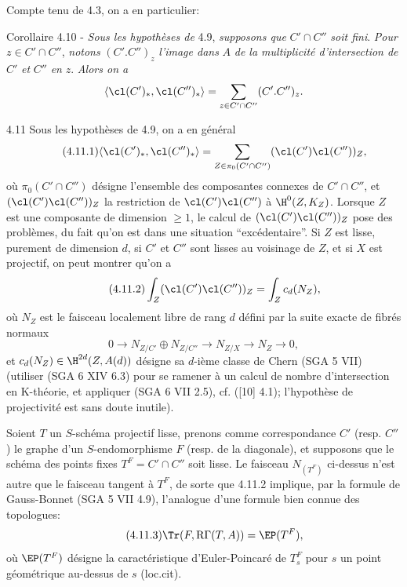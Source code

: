 Compte tenu de 4.3, on a en particulier:

\begin{statement}{Corollaire 4.10 -}
\emph{Sous les hypothèses de} 4.9, \emph{supposons que} $C'\cap C''$ \emph{soit fini}. \emph{Pour} $z\in C'\cap C''$, \emph{notons} $(C'.C'')_z$ \emph{l'image dans} $A$ \emph{de la multiplicité d'intersection de} $C'$ \emph{et} $C''$ \emph{en} $z$. \emph{Alors on a}
\[
\langle \cl(C')_*,\cl(C'')_*\rangle
=
\sum_{z\in C'\cap C''}(C'.C'')_z.
\]
\end{statement}

\begin{statement}{4.11}
Sous les hypothèses de 4.9, on a en général
\begin{equation}
\tag{4.11.1}
\langle \cl(C')_*,\cl(C'')_*\rangle
=
\sum_{Z\in\pi_0(C'\cap C'')}(\cl(C')\cl(C''))_Z,
\end{equation}
où $\pi_0(C'\cap C'')$ désigne l'ensemble des composantes connexes de $C'\cap C''$, et $(\cl(C')\cl(C''))_Z$ la restriction de $\cl(C')\cl(C'')$ à $\H^0(Z,K_Z)$. Lorsque $Z$ est une composante de dimension $\geq 1$, le calcul de $(\cl(C')\cl(C''))_Z$ pose des problèmes, du fait qu'on est dans une situation ``excédentaire''. Si $Z$ est lisse, purement de dimension $d$, si $C'$ et $C''$ sont lisses au voisinage de $Z$, et si $X$ est projectif, on peut montrer qu'on a
\begin{equation}
\tag{4.11.2}
\int_Z(\cl(C')\cl(C''))_Z=\int_Z c_d(N_Z),
\end{equation}
où $N_Z$ est le faisceau localement libre de rang $d$ défini par la suite exacte de fibrés normaux
\[
0\longrightarrow N_{Z/C'}\oplus N_{Z/C''}\longrightarrow N_{Z/X}\longrightarrow N_Z\longrightarrow 0,
\]
et $c_d(N_Z)\in \H^{2d}(Z,A(d))$ désigne sa $d$-ième classe de Chern (SGA 5 VII) (utiliser (SGA 6 XIV 6.3) pour se ramener à un calcul de nombre d'intersection en K-théorie, et appliquer (SGA 6 VII 2.5), cf. ([10] 4.1); l'hypothèse de projectivité est sans doute inutile).

Soient $T$ un $S$-schéma projectif lisse, prenons comme correspondance $C'$ (resp. $C''$) le graphe d'un $S$-endomorphisme $F$ (resp. de la diagonale), et supposons que le schéma des points fixes $T^F=C'\cap C''$ soit lisse. Le faisceau $N_{(T^F)}$ ci-dessus n'est autre que le faisceau tangent à $T^F$, de sorte que 4.11.2 implique, par la formule de Gauss-Bonnet (SGA 5 VII 4.9), l'analogue d'une formule bien connue des topologues:
\begin{equation}
\tag{4.11.3}
\Tr(F,\mathrm{R}\Gamma(T,A))=\EP(T^F),
\end{equation}
où $\EP(T^F)$ désigne la caractéristique d'Euler-Poincaré de $T_s^F$ pour $s$ un point géométrique au-dessus de $s$ (loc.cit).
\end{statement}

